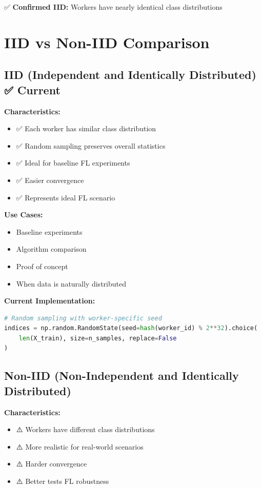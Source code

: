 \documentclass[12pt]{article}
\begin{document}
✅ \textbf{Confirmed IID:} Workers have nearly identical class distributions

\section{IID vs Non-IID Comparison}

\subsection{IID (Independent and Identically Distributed) ✅ Current}

\textbf{Characteristics:}
\begin{itemize}
    \item ✅ Each worker has similar class distribution
    \item ✅ Random sampling preserves overall statistics
    \item ✅ Ideal for baseline FL experiments
    \item ✅ Easier convergence
    \item ✅ Represents ideal FL scenario
\end{itemize}

\textbf{Use Cases:}
\begin{itemize}
    \item Baseline experiments
    \item Algorithm comparison
    \item Proof of concept
    \item When data is naturally distributed
\end{itemize}

\textbf{Current Implementation:}
\begin{lstlisting}[language=Python]
# Random sampling with worker-specific seed
indices = np.random.RandomState(seed=hash(worker_id) % 2**32).choice(
    len(X_train), size=n_samples, replace=False
)
\end{lstlisting}

\subsection{Non-IID (Non-Independent and Identically Distributed)}

\textbf{Characteristics:}
\begin{itemize}
    \item ⚠️ Workers have different class distributions
    \item ⚠️ More realistic for real-world scenarios
    \item ⚠️ Harder convergence
    \item ⚠️ Better tests FL robustness
\end{itemize}
\end{document}
